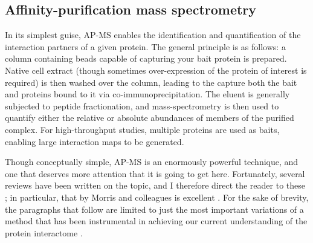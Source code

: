 \documentclass[a4paper,11pt,twoside,openright]{scrbook}
\begin{document}


\subsection{Affinity-purification mass spectrometry}
In its simplest guise, AP-MS enables the identification and quantification of the interaction partners of a given protein. The general principle is as follows: a column containing beads capable of capturing your bait protein is prepared. Native cell extract (though sometimes over-expression of the protein of interest is required) is then washed over the column, leading to the capture both the bait and proteins bound to it via co-immunoprecipitation. The eluent is generally subjected to peptide fractionation, and mass-spectrometry is then used to quantify either the relative or absolute abundances of members of the purified complex. For high-throughput studies, multiple proteins are used as baits, enabling large interaction maps to be generated.

Though conceptually simple, AP-MS is an enormously powerful technique, and one that deserves more attention that it is going to get here. Fortunately, several reviews have been written on the topic, and I therefore direct the reader to these \cite{Oeffinger2012,Morris2014,Aebersold2016}; in particular, that by Morris and colleagues is excellent \cite{Morris2014}. For the sake of brevity, the paragraphs that follow are limited to just the most important variations of a method that has been instrumental in achieving our current understanding of the protein interactome \cite{Malovannaya2011,Hein2015,Huttlin2015,Wan2015}.

\end{document}
